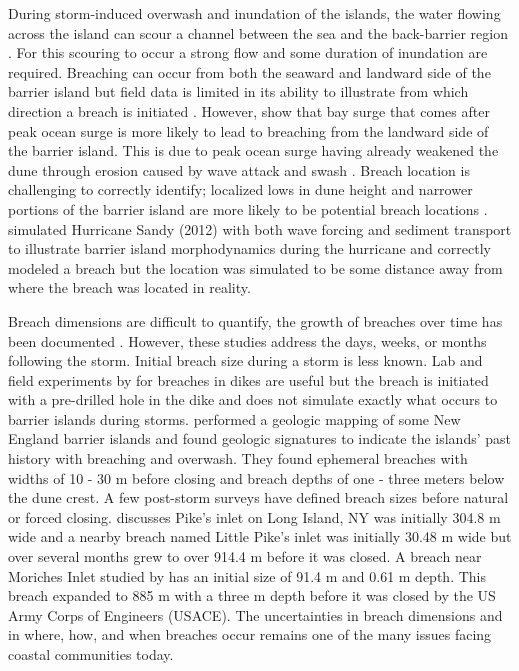 \documentclass{coastal_paper}
\begin{document}
During storm-induced overwash and inundation of the islands, the water flowing across the island can scour a channel between the sea and the back-barrier region \citep{Kraus2003, Pierce1970, Roelvink2009}. For this scouring to occur a strong flow and some duration of inundation are required. Breaching can occur from both the seaward and landward side of the barrier island but field data is limited in its ability to illustrate from which direction a breach is initiated \citep{Kraus2003, Pierce1970, Smallegan2017}. However, \citet{Smallegan2017} show that bay surge that comes after peak ocean surge is more likely to lead to breaching from the landward side of the barrier island. This is due to peak ocean surge having already weakened the dune through erosion caused by wave attack and swash \citep{Kraus2003, Smallegan2017}. Breach location is challenging to correctly identify; localized lows in dune height and narrower portions of the barrier island are more likely to be potential breach locations \citep{Kraus2003, Kraus2003a}. \citet{Vander2019} simulated Hurricane Sandy (2012) with both wave forcing and sediment transport to illustrate barrier island morphodynamics during the hurricane and correctly modeled a breach but the location was simulated to be some distance away from where the breach was located in reality. 

Breach dimensions are difficult to quantify, the growth of breaches over time has been documented \citep{Kraus2003a, Schmeltz1983Breach/InletInlet.}. However, these studies address the days, weeks, or months following the storm. Initial breach size during a storm is less known. Lab and field experiments by \citet{Visser1999} for breaches in dikes are useful but the breach is initiated with a pre-drilled hole in the dike and does not simulate exactly what occurs to barrier islands during storms. \citet{Buynevich2006} performed a geologic mapping of some New England barrier islands and found geologic signatures to indicate the islands' past history with breaching and overwash. They found ephemeral breaches with widths of 10 - 30 m before closing and breach depths of one - three meters below the dune crest. A few post-storm surveys have defined breach sizes before natural or forced closing. \cite{Kraus2003a} discusses Pike's inlet on Long Island, NY was initially 304.8 m wide and a nearby breach named Little Pike's inlet was initially 30.48 m wide but over several months grew to over 914.4 m before it was closed. A breach near Moriches Inlet studied by \cite{Schmeltz1983Breach/InletInlet.} has an initial size of 91.4 m and 0.61 m depth. This breach expanded to 885 m with a three m depth before it was closed by the US Army Corps of Engineers (USACE). The uncertainties in breach dimensions and  in where, how, and when breaches occur remains one of the many issues facing coastal communities today.
\end{document}
